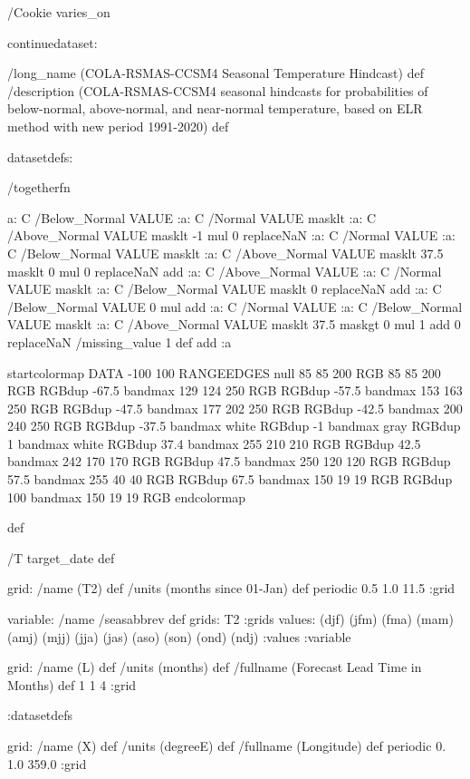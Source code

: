 \begin{ingrid}

/Cookie varies_on

continuedataset:

/long_name (COLA-RSMAS-CCSM4 Seasonal Temperature Hindcast) def
/description (COLA-RSMAS-CCSM4 seasonal hindcasts for probabilities of below-normal, above-normal, and near-normal temperature, based on ELR method with new period 1991-2020) def

datasetdefs:

/togetherfn {
 a:
    C /Below_Normal VALUE
    :a:
     C /Normal VALUE
     masklt
    :a:
     C /Above_Normal VALUE
     masklt
    -1 mul
    0 replaceNaN
    :a:
     C /Normal VALUE
     :a:
      C /Below_Normal VALUE
      masklt
     :a:
      C /Above_Normal VALUE
      masklt
     37.5 masklt
     0 mul
     0 replaceNaN           
     add
    :a:
     C /Above_Normal VALUE
     :a:
      C /Normal VALUE
      masklt
     :a:
      C /Below_Normal VALUE
      masklt
     0 replaceNaN
     add
 :a:
     C /Below_Normal VALUE
     0 mul
     add
    :a:
     C /Normal VALUE
     :a:
      C /Below_Normal VALUE
      masklt
     :a:
      C /Above_Normal VALUE        
      masklt
     37.5 maskgt
     0 mul
     1 add
     0 replaceNaN
     /missing_value 1 def
     add
    :a

startcolormap
DATA -100 100 RANGEEDGES
null 85 85 200 RGB
85 85 200 RGB RGBdup -67.5 bandmax
129 124 250 RGB RGBdup -57.5 bandmax
153 163 250 RGB RGBdup -47.5 bandmax
177 202 250 RGB RGBdup -42.5 bandmax
200 240 250 RGB RGBdup -37.5 bandmax
white RGBdup -1 bandmax
gray RGBdup 1 bandmax
white RGBdup 37.4 bandmax
255 210 210 RGB RGBdup 42.5 bandmax
242 170 170 RGB RGBdup 47.5 bandmax
250 120 120 RGB RGBdup 57.5 bandmax
255 40 40 RGB RGBdup 67.5 bandmax
150 19 19 RGB RGBdup 100 bandmax
150 19 19 RGB
endcolormap
} def 

/T {target_date} def

grid:
/name (T2) def
/units (months since 01-Jan) def
periodic
0.5 1.0 11.5
:grid

variable:
/name /seasabbrev def
grids: T2 :grids
values: (djf) (jfm) (fma) (mam) (amj) (mjj) (jja) (jas) (aso) (son) (ond) (ndj) :values
:variable

 grid:
 /name (L) def
 /units (months) def
 /fullname (Forecast Lead Time in Months) def
 1 1 4
 :grid

:datasetdefs

grid:
/name (X) def
/units (degreeE) def
/fullname (Longitude) def
periodic
0. 1.0 359.0
:grid


\end{ingrid}
